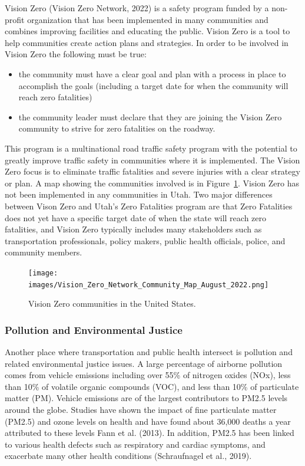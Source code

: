 \documentclass[
  letterpaper,
  authoryear,
  review,
  3p]{elsarticle}
\providecommand{\tightlist}{%
  \setlength{\itemsep}{0pt}\setlength{\parskip}{0pt}}\usepackage{longtable,booktabs,array}
\begin{document}
Vision Zero (Vision Zero Network, 2022) is a safety program funded by a
non-profit organization that has been implemented in many communities
and combines improving facilities and educating the public. Vision Zero
is a tool to help communities create action plans and strategies. In
order to be involved in Vision Zero the following must be true:

\begin{itemize}
\tightlist
\item
  the community must have a clear goal and plan with a process in place
  to accomplish the goals (including a target date for when the
  community will reach zero fatalities)
\item
  the community leader must declare that they are joining the Vision
  Zero community to strive for zero fatalities on the roadway.
\end{itemize}

This program is a multinational road traffic safety program with the
potential to greatly improve traffic safety in communities where it is
implemented. The Vision Zero focus is to eliminate traffic fatalities
and severe injuries with a clear strategy or plan. A map showing the
communities involved is in Figure~\ref{fig-visionzero}. Vision Zero has
not been implemented in any communities in Utah. Two major differences
between Vison Zero and Utah's Zero Fatalities program are that Zero
Fatalities does not yet have a specific target date of when the state
will reach zero fatalities, and Vision Zero typically includes many
stakeholders such as transportation professionals, policy makers, public
health officials, police, and community members.

\begin{figure}

{\centering \texttt{[image: images/Vision\_Zero\_Network\_Community\_Map\_August\_2022.png]}

}

\caption{\label{fig-visionzero}Vision Zero communities in the United
States.}

\end{figure}

\hypertarget{pollution-and-environmental-justice}{%
\subsubsection{Pollution and Environmental
Justice}\label{pollution-and-environmental-justice}}

Another place where transportation and public health intersect is
pollution and related environmental justice issues. A large percentage
of airborne pollution comes from vehicle emissions including over 55\%
of nitrogen oxides (NOx), less than 10\% of volatile organic compounds
(VOC), and less than 10\% of particulate matter (PM). Vehicle emissions
are of the largest contributors to PM2.5 levels around the globe.
Studies have shown the impact of fine particulate matter (PM2.5) and
ozone levels on health and have found about 36,000 deaths a year
attributed to these levels Fann et al. (2013). In addition, PM2.5 has
been linked to various health defects such as respiratory and cardiac
symptoms, and exacerbate many other health conditions (Schraufnagel et
al., 2019).
\end{document}
